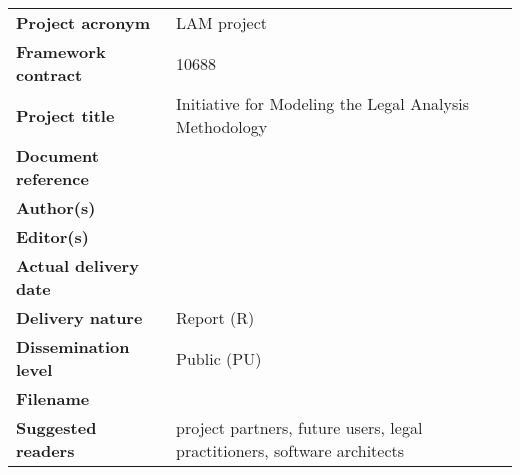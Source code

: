 \clearpage


\setlength{\headheight}{1cm}
\setlength{\footskip}{18mm}
\addtolength{\textheight}{-\footskip}
\pagestyle{empty}

\clearpage



\vspace{6cm}

\begin{flushleft}
\begin{table*}[!b]
	  \begin{tabular}{p{4.5cm}p{\textwidth-5cm}}
		\textbf{Project acronym}       &   LAM project\\
		\textbf{Framework contract}    &   10688 \\ 
		\textbf{Project title}    &   Initiative for Modeling the Legal Analysis Methodology  \\
		\textbf{Document reference} 	&   \DelTitle \\	
		\textbf{Author(s)}             &   \DelAuthor \\
		\textbf{Editor(s)}             &   \DelAuthor \\
		\textbf{Actual delivery date}  &   \DelDate \\    
		\textbf{Delivery nature}     	&   Report (R) \\
		\textbf{Dissemination level} 	&   Public (PU) \\
		\textbf{Filename}           	&   \DelFilename\\
		\textbf{Suggested readers}    	&   project partners, future users, legal practitioners, software architects\\
	\end{tabular}
\end{table*}
\end{flushleft}



\clearpage

\clearpage





